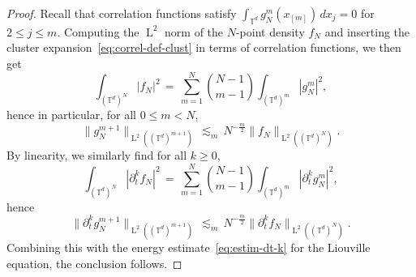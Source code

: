 \documentclass[a4paper,11pt,reqno,noindent]{amsart}
\theoremstyle{plain}
\numberwithin{equation}{section}
\newcommand{\T}{\mathbb T}
\newcommand{\3}{|\!|\!|}
\newcommand{\Ld}{\operatorname{L}}
\begin{document}
\begin{proof}
Recall that correlation functions satisfy $\int_{\T^d}g_N^m(x_{[m]})\,dx_j=0$ for \mbox{$2\le j\le m$.} 
Computing the $\Ld^2$ norm of the $N$-point density $f_N$ and inserting the cluster expansion~\eqref{eq:correl-def-clust} in terms of correlation functions, we then get
\begin{equation}\label{eq:norm-cluster}
\int_{(\T^d)^N}|f_N|^2\,=\,\sum_{m=1}^N\binom{N-1}{m-1}\int_{(\T^d)^{m}}|g_N^{m}|^2,
\end{equation}
hence in particular, for all $0\le m< N$,
\[\|g_N^{m+1}\|_{\Ld^2((\T^d)^{m+1})}\,\lesssim_m\,N^{-\frac m2}\|f_N\|_{\Ld^2((\T^d)^N)}.\]
By linearity, we similarly find for all $k\ge0$,
\begin{equation}\label{eq:cluster-L2fN}
\int_{(\T^d)^N}|\partial_t^kf_N|^2\,=\,\sum_{m=1}^N\binom{N-1}{m-1}\int_{(\T^d)^{m}}|\partial_t^kg_N^{m}|^2,
\end{equation}
hence
\[\|\partial_t^kg_N^{m+1}\|_{\Ld^2((\T^d)^{m+1})}\,\lesssim_m\,N^{-\frac m2}\|\partial_t^kf_N\|_{\Ld^2((\T^d)^N)}.\]
Combining this with the energy estimate~\eqref{eq:estim-dt-k} for the Liouville equation, the conclusion follows.
\end{proof}
\end{document}
